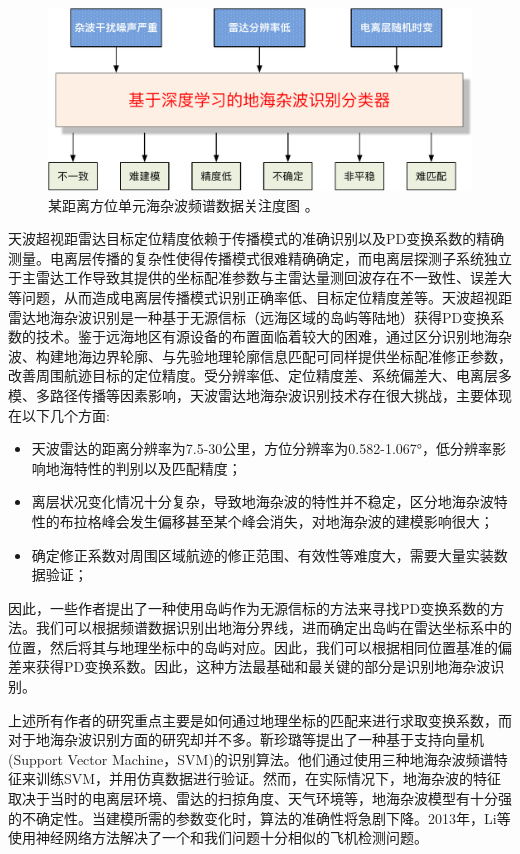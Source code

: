 \begin{figure}[!t]
	\centering
	\includegraphics[width=\textwidth]{figures/clutterproblem.pdf}
	\caption{某距离方位单元海杂波频谱数据关注度图
	。}
	\label{fig:visfeature}
\end{figure}

天波超视距雷达目标定位精度依赖于传播模式的准确识别以及PD变换系数的精确测量。电离层传播的复杂性使得传播模式很难精确确定，而电离层探测子系统独立于主雷达工作导致其提供的坐标配准参数与主雷达量测回波存在不一致性、误差大等问题，从而造成电离层传播模式识别正确率低、目标定位精度差等。天波超视距雷达地海杂波识别是一种基于无源信标（远海区域的岛屿等陆地）获得PD变换系数的技术。鉴于远海地区有源设备的布置面临着较大的困难，通过区分识别地海杂波、构建地海边界轮廓、与先验地理轮廓信息匹配可同样提供坐标配准修正参数，改善周围航迹目标的定位精度。受分辨率低、定位精度差、系统偏差大、电离层多模、多路径传播等因素影响，天波雷达地海杂波识别技术存在很大挑战，主要体现在以下几个方面:
\begin{itemize}
	\item 天波雷达的距离分辨率为7.5-30公里，方位分辨率为0.582-1.067°，低分辨率影响地海特性的判别以及匹配精度；
	\item 离层状况变化情况十分复杂，导致地海杂波的特性并不稳定，区分地海杂波特性的布拉格峰会发生偏移甚至某个峰会消失，对地海杂波的建模影响很大；
	\item 确定修正系数对周围区域航迹的修正范围、有效性等难度大，需要大量实装数据验证；
\end{itemize}

因此，一些作者提出了一种使用岛屿作为无源信标的方法来寻找PD变换系数\cite{cuccoli2011coordinate}的方法。我们可以根据频谱数据识别出地海分界线，进而确定出岛屿在雷达坐标系中的位置，然后将其与地理坐标中的岛屿对应。因此，我们可以根据相同位置基准的偏差来获得PD变换系数。因此，这种方法最基础和最关键的部分是识别地海杂波识别。

上述所有作者的研究重点主要是如何通过地理坐标的匹配来进行求取变换系数，而对于地海杂波识别方面的研究却并不多。靳珍璐等\cite{jin2012svm}提出了一种基于支持向量机(Support Vector Machine，SVM)的识别算法。他们通过使用三种地海杂波频谱特征来训练SVM，并用仿真数据进行验证。然而，在实际情况下，地海杂波的特征取决于当时的电离层环境、雷达的扫掠角度、天气环境等，地海杂波模型有十分强的不确定性。当建模所需的参数变化时，算法的准确性将急剧下降。2013年，Li等\cite{li2013high} 使用神经网络方法解决了一个和我们问题十分相似的飞机检测问题。

